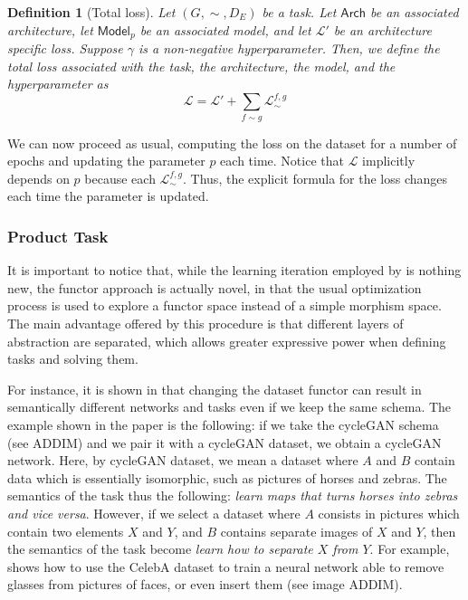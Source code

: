 \documentclass[12pt,a4paper,openright,twoside]{report}
\theoremstyle{plain}
\newtheorem{definition}[proposition]{Definition}
\theoremstyle{definition}
\begin{document}
\begin{definition}[Total loss]
  Let $(G,{\sim},D_E)$ be a task. Let $\mathsf{Arch}$ be an associated architecture, let $\mathsf{Model}_p$ be an associated model, and let $\mathcal{L}'$ be an architecture specific loss. Suppose $\gamma$ is a non-negative hyperparameter. Then, we define the total loss associated with the task, the architecture, the model, and the hyperparameter as
  \begin{equation}
    \label{eq: sumoflosses}
    \mathcal{L} = \mathcal{L}' + \sum_{f \sim g}\mathcal{L}_{\sim}^{f,g}
  \end{equation}
\end{definition}

We can now proceed as usual, computing the loss on the dataset for a number of epochs and updating the parameter $p$ each time. Notice that $\mathcal{L}$ implicitly depends on $p$ because each $\mathcal{L}_{\sim}^{f,g}$. Thus, the explicit formula for the loss changes each time the parameter is updated.


\subsubsection{Product Task}


It is important to notice that, while the learning iteration employed by \cite{gavranovic2019compositional} is nothing new, the functor approach is actually novel, in that the usual optimization process is used to explore a functor space instead of a simple morphism space. The main advantage offered by this procedure is that different layers of abstraction are separated, which allows greater expressive power when defining tasks and solving them. 


For instance, it is shown in \cite{gavranovic2019compositional} that changing the dataset functor can result in semantically different networks and tasks even if we keep the same schema. The example shown in the paper is the following: if we take the cycleGAN schema (see ADDIM) and we pair it with a cycleGAN dataset, we obtain a cycleGAN network. Here, by cycleGAN dataset, we mean a dataset where $A$ and $B$ contain data which is essentially isomorphic, such as pictures of horses and zebras. The semantics of the task thus the following: \textit{learn maps that turns horses into zebras and vice versa}. However, if we select a dataset where $A$ consists in pictures which contain two elements $X$ and $Y$, and $B$ contains separate images of $X$ and $Y$, then the semantics of the task become \textit{learn how to separate $X$ from $Y$}. For example, \cite{gavranovic2019compositional} shows how to use the CelebA dataset to train a neural network able to remove glasses from pictures of faces, or even insert them (see image ADDIM).
\end{document}
